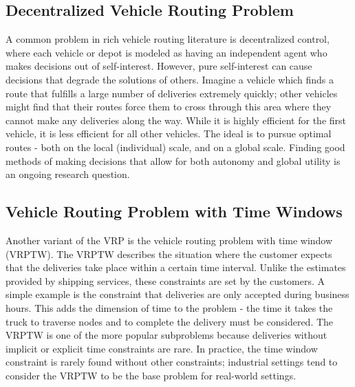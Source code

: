 \documentclass{sig-alternate}
\begin{document}
{\subsection{Decentralized Vehicle Routing Problem}
A common problem in rich vehicle routing literature is decentralized control, where each vehicle or depot is modeled as having an independent agent who makes decisions out of self-interest. However, pure self-interest can cause decisions that degrade the solutions of others. Imagine a vehicle which finds a route that fulfills a large number of deliveries extremely quickly; other vehicles might find that their routes force them to cross through this area where they cannot make any deliveries along the way. While it is highly efficient for the first vehicle, it is less efficient for all other vehicles. The ideal is to pursue optimal routes - both on the local (individual) scale, and on a global scale. Finding good methods of making decisions that allow for both autonomy and global utility is an ongoing research question. 
\subsection{Vehicle Routing Problem with Time Windows}
Another variant of the VRP is the vehicle routing problem with time window (VRPTW). The VRPTW describes the situation where the customer expects that the deliveries take place within a certain time interval. Unlike the estimates provided by shipping services, these constraints are set by the customers. A simple example is the constraint that deliveries are only accepted during business hours. This adds the dimension of time to the problem - the time it takes the truck to traverse nodes and to complete the delivery must be considered. The VRPTW is one of the more popular subproblems because deliveries without implicit or explicit time constraints are rare. In practice, the time window constraint is rarely found without other constraints; industrial settings tend to consider the VRPTW to be the base problem for real-world settings. 
}
\end{document}
